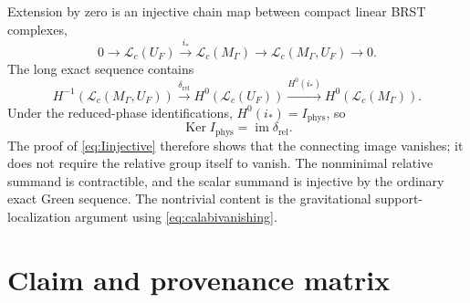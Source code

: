 \documentclass[11pt]{article}
\theoremstyle{definition}
\theoremstyle{remark}
\newcommand{\U}{U_{F}}
\newcommand{\M}{M_{\Gamma}}
\newcommand{\Ker}{\operatorname{Ker}}
\newcommand{\im}{\operatorname{im}}
\newcommand{\cL}{\mathcal L}
\begin{document}
Extension by zero is an injective chain map between compact linear BRST complexes,
\begin{equation}
 0\longrightarrow\cL_c(\U)
 \xrightarrow{i_*}\cL_c(\M)
 \longrightarrow\cL_c(\M,\U)\longrightarrow0.
\end{equation}
The long exact sequence contains
\begin{equation}
 H^{-1}(\cL_c(\M,\U))\xrightarrow{\delta_{\mathrm{rel}}}
 H^0(\cL_c(\U))\xrightarrow{H^0(i_*)}H^0(\cL_c(\M)).
\end{equation}
Under the reduced-phase identifications, $H^0(i_*)=I_{\mathrm{phys}}$, so
\begin{equation}
 \Ker I_{\mathrm{phys}}=\im\delta_{\mathrm{rel}}.
\end{equation}
The proof of \cref{eq:Iinjective} therefore shows that the connecting image vanishes;
it does not require the relative group itself to vanish.  The nonminimal relative
summand is contractible, and the scalar summand is injective by the ordinary exact
Green sequence.  The nontrivial content is the gravitational support-localization
argument using \cref{eq:calabivanishing}.

\section{Claim and provenance matrix}
\end{document}
